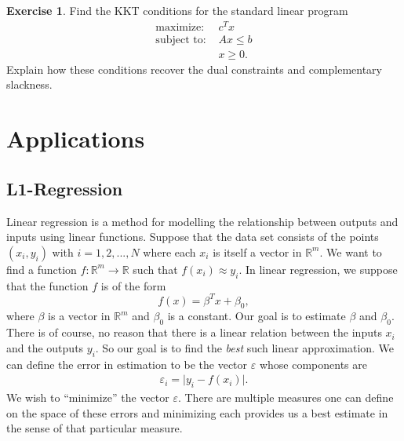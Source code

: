\documentclass[
]{book}
\theoremstyle{definition}
\theoremstyle{definition}
\theoremstyle{definition}
\newtheorem{exercise}{Exercise}[chapter]
\theoremstyle{definition}
\theoremstyle{remark}
\begin{document}
\begin{exercise}
Find the KKT conditions for the standard linear program
\begin{align*}
  \mbox{maximize: } & c^T x \\
  \mbox{subject to: } & Ax \le b \\ 
  & x \ge 0.
\end{align*}
Explain how these conditions recover the dual constraints and complementary slackness.
\end{exercise}

\hypertarget{part-applications}{%
\part{Applications}\label{part-applications}}

\hypertarget{l1-regression}{%
\chapter{L1-Regression}\label{l1-regression}}

Linear regression is a method for modelling the relationship between outputs and inputs using linear functions.
Suppose that the data set consists of the points \((x_i, y_i)\) with \(i = 1, 2, ..., N\) where each \(x_i\) is itself a vector in \(\mathbb{R}^m\).
We want to find a function \(f : \mathbb{R}^m \to \mathbb{R}\) such that \(f(x_{i}) \approx y_{i}\).
In linear regression, we suppose that the function \(f\) is of the form \[f(x) = \beta^T x + \beta_0,\] where \(\beta\) is a vector in \(\mathbb{R}^m\) and \(\beta_0\) is a constant.
Our goal is to estimate \(\beta\) and \(\beta_0\).
There is of course, no reason that there is a linear relation between the inputs \(x_i\) and the
outputs \(y_i\).
So our goal is to find the \emph{best} such linear approximation.
We can define the error in estimation to be the vector \(\varepsilon\) whose components are
\begin{align*}
  \varepsilon_i = \lvert y_i - f(x_i) \rvert.
\end{align*}
We wish to ``minimize'' the vector \(\varepsilon\).
There are multiple measures one can define on the space of these errors and minimizing each provides us a best estimate in the sense of that particular measure.
\end{document}
